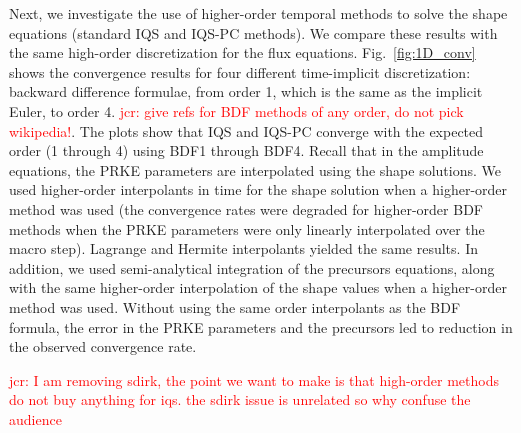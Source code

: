 \documentclass{elsarticle}
\newcommand{\fig}[1]{Fig.~\ref{#1}}                      %
\newcommand{\iqspc}{IQS-PC\xspace}
\newcommand{\jcr}[1]{\textcolor{red}{jcr: #1}}
\begin{document}

Next, we investigate the use of higher-order temporal methods to solve the shape equations (standard IQS and \iqspc methods). We compare these results with the same high-order discretization for the flux equations.
\fig{fig:1D_conv} shows the convergence results for four different time-implicit discretization: backward difference formulae, from order 1, which is the same as the implicit Euler, to order 4.
\jcr{give refs for BDF methods of any order, do not pick wikipedia!}. %
The plots show that IQS and \iqspc converge with the expected order (1 through 4) using BDF1 through BDF4. Recall that in the amplitude equations, the PRKE parameters
are interpolated using the shape solutions. We used higher-order interpolants in time for the shape solution when a higher-order method was used
(the convergence rates were degraded for higher-order BDF methods when the PRKE parameters were only linearly interpolated over the macro step). Lagrange
and Hermite interpolants yielded the same results. In addition, we used semi-analytical integration of the precursors equations, along with the same higher-order
interpolation of the shape values when a higher-order method was used. Without using the same order interpolants as the BDF formula, the error in the
PRKE parameters and the precursors led to reduction in the observed convergence rate.

\jcr{I am removing sdirk, the point we want to make is that high-order methods do not buy anything for iqs. the sdirk issue is unrelated so why confuse the audience}
\end{document}
